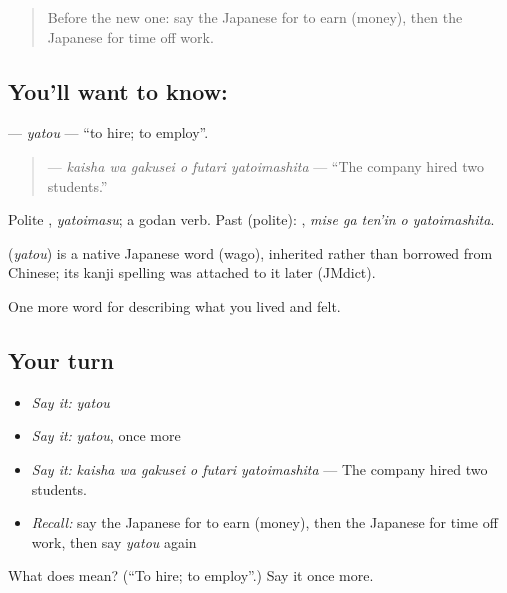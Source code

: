 \begin{quote}
Before the new one: say the Japanese for to earn (money), then the Japanese for time off work.
\end{quote}

\subsection*{You'll want to know: }
\textbf{} — \emph{yatou} — \textquotedblleft{}to hire; to employ\textquotedblright{}.

\begin{quote}
\textbf{   } — \emph{kaisha wa gakusei o futari yatoimashita} — \textquotedblleft{}The company hired two students.\textquotedblright{}
\end{quote}

Polite \textbf{}, \emph{yatoimasu}; a godan verb. Past (polite): \textbf{  }, \emph{mise ga ten'in o yatoimashita}.

\begin{cousinweb}
\textbf{} (\emph{yatou}) is a native Japanese word (wago), inherited rather than borrowed from Chinese; its kanji spelling was attached to it later (JMdict).
\end{cousinweb}

\begin{grammarlens}[title={What you've built}]
One more word for describing what you lived and felt.
\end{grammarlens}

\subsection*{Your turn}
\begin{itemize}
\raggedright
  \item \emph{Say it:} \emph{yatou}
  \item \emph{Say it:} \emph{yatou}, once more
  \item \emph{Say it:} \emph{kaisha wa gakusei o futari yatoimashita} — The company hired two students.
  \item \emph{Recall:} say the Japanese for to earn (money), then the Japanese for time off work, then say \emph{yatou} again
\end{itemize}

\begin{tcolorbox}[breakable,colback=teal!4,colframe=teal!35!black,title={Before you move on}]
What does  mean? (\textquotedblleft{}To hire; to employ\textquotedblright{}.) Say it once more.
\end{tcolorbox}
